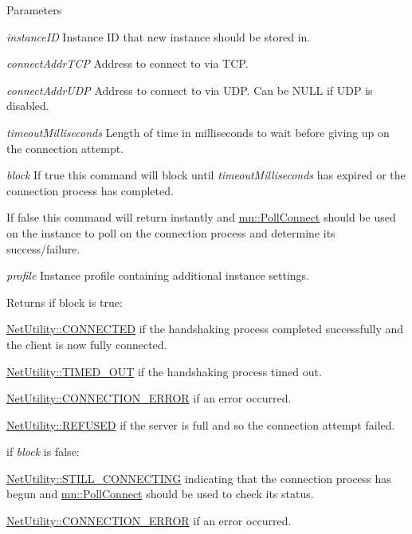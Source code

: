 \begin{DoxyParams}{Parameters}
\item[{\em instanceID}]Instance ID that new instance should be stored in. \item[{\em connectAddrTCP}]Address to connect to via TCP. \item[{\em connectAddrUDP}]Address to connect to via UDP. Can be NULL if UDP is disabled. \item[{\em timeoutMilliseconds}]Length of time in milliseconds to wait before giving up on the connection attempt. \item[{\em block}]If true this command will block until {\itshape timeoutMilliseconds\/} has expired or the connection process has completed. \par
 If false this command will return instantly and \hyperlink{namespacemn_a3f6e329576ac7a8c036f2040bd6314a3}{mn::PollConnect} should be used on the instance to poll on the connection process and determine its success/failure. \item[{\em profile}]Instance profile containing additional instance settings.\end{DoxyParams}
\begin{DoxyReturn}{Returns}
if block is true: \par
 

\hyperlink{class_net_utility_a7eae52138f8bd597ffc67ebf07e86b6da9c07ac24fb9bdd4157ace978968721fd}{NetUtility::CONNECTED} if the handshaking process completed successfully and the client is now fully connected. 

\hyperlink{class_net_utility_a7eae52138f8bd597ffc67ebf07e86b6da319e02f6059b4b08edd70c16fa5206fd}{NetUtility::TIMED\_\-OUT} if the handshaking process timed out. 

\hyperlink{class_net_utility_a7eae52138f8bd597ffc67ebf07e86b6da7c6b34544a99c4c264366f2fed4f0973}{NetUtility::CONNECTION\_\-ERROR} if an error occurred. 

\hyperlink{class_net_utility_a7eae52138f8bd597ffc67ebf07e86b6dabc894c2de7a4404e353f3bcc1193e90b}{NetUtility::REFUSED} if the server is full and so the connection attempt failed.\par
\par


if {\itshape block\/} is false:\par
 

\hyperlink{class_net_utility_a7eae52138f8bd597ffc67ebf07e86b6da86caa623f8ffc60da40df3c2ab17532c}{NetUtility::STILL\_\-CONNECTING} indicating that the connection process has begun and \hyperlink{namespacemn_a3f6e329576ac7a8c036f2040bd6314a3}{mn::PollConnect} should be used to check its status. 

\hyperlink{class_net_utility_a7eae52138f8bd597ffc67ebf07e86b6da7c6b34544a99c4c264366f2fed4f0973}{NetUtility::CONNECTION\_\-ERROR} if an error occurred. 
\end{DoxyReturn}

